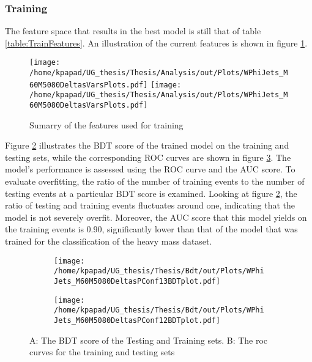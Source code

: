 \subsubsection{Training}
\label{sec:orgeb07776}
\label{sec:Light:Training}
The feature space that results in the best model is still that of table \ref{table:TrainFeatures}. An illustration of the current features is shown in figure \ref{fig:LightFeatures}.
\begin{figure}[h!]
\centering
\texttt{[image: /home/kpapad/UG\_thesis/Thesis/Analysis/out/Plots/WPhiJets\_M60M5080DeltasVarsPlots.pdf]}
\texttt{[image: /home/kpapad/UG\_thesis/Thesis/Analysis/out/Plots/WPhiJets\_M60M5080DeltasVarsPlots.pdf]}
\caption{Sumarry of the features used for training }
\label{fig:LightFeatures}
\end{figure}

Figure \ref{subfig:LightBdtPlot} illustrates the BDT score of the trained model on the training and testing sets, while the corresponding ROC curves are shown in figure \ref{subfig:LightROCCurves}. The model's performance is assessed using the ROC curve and the AUC score. To evaluate overfitting, the ratio of the number of training events to the number of testing events at a particular BDT score is examined. Looking at figure \ref{subfig:LightBdtPlot}, the ratio of testing and training events fluctuates around one, indicating that the model is not severely overfit. Moreover, the AUC score that this model yields on the training events is 0.90, significantly lower than that of the model that was trained for the classification of the heavy mass dataset.
\begin{figure}[h!]
\centering
\begin{subfigure}{0.49\textwidth}
\centering
\texttt{[image: /home/kpapad/UG\_thesis/Thesis/Bdt/out/Plots/WPhiJets\_M60M5080DeltasPConf13BDTplot.pdf]}
\caption{}
\label{subfig:LightBdtPlot}
\end{subfigure}
\begin{subfigure}{0.49\textwidth}
\centering
\texttt{[image: /home/kpapad/UG\_thesis/Thesis/Bdt/out/Plots/WPhiJets\_M60M5080DeltasPConf12BDTplot.pdf]}
\caption{}
\label{subfig:LightROCCurves}
\end{subfigure}
\caption{A: The BDT score of the Testing and Training sets. B: The roc curves for the training and testing sets}
\label{fig:BDTplot}
\end{figure}


